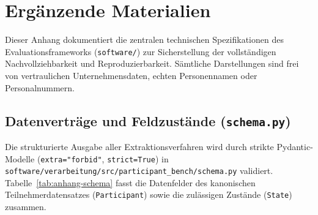 \chapter{Ergänzende Materialien}
\label{app:materialien}

Dieser Anhang dokumentiert die zentralen technischen Spezifikationen des Evaluationsframeworks (\texttt{software/}) zur Sicherstellung der vollständigen Nachvollziehbarkeit und Reproduzierbarkeit. Sämtliche Darstellungen sind frei von vertraulichen Unternehmensdaten, echten Personennamen oder Personalnummern.

\section{Datenverträge und Feldzustände (\texttt{schema.py})}
\label{app:schema}

Die strukturierte Ausgabe aller Extraktionsverfahren wird durch strikte Pydantic-Modelle (\texttt{extra="forbid"}, \texttt{strict=True}) in \texttt{software/verarbeitung/src/participant\_bench/schema.py} validiert. Tabelle~\ref{tab:anhang-schema} fasst die Datenfelder des kanonischen Teilnehmerdatensatzes (\texttt{Participant}) sowie die zulässigen Zustände (\texttt{State}) zusammen.

